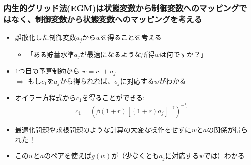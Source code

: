 \documentclass[unicode,9pt]{beamer}%
\begin{document}

\begin{frame}\frametitle{内生的グリッド法(EGM)は状態変数から制御変数へのマッピングではなく、制御変数から状態変数へのマッピングを考える}
  \begin{itemize}
    \item 離散化した制御変数$a_j$から$w$を得ることを考える
      \begin{itemize}
        \item 「ある貯蓄水準$a_j$が最適になるような所得$w$は何ですか？」
      \end{itemize}
      \bigskip
    \item 1つ目の予算制約から $w = c_1 + a_j$ \\
      $\Rightarrow$ もし$c_1$を$a_j$から得られれば、$a_j$に対応する$w$がわかる
    \item オイラー方程式から$c_1$を得ることができる:
      $$
        c_1 = \left(\beta (1 + r) \left[ (1 + r) a_j \right]^{-\gamma} \right)^{- \frac{1}{\gamma}}
      $$
    \item 最適化問題や求根問題のような計算の大変な操作をせずに$w$と$a$の関係が得られた！
    \item この$w$と$a$のペアを使えば$g(w)$が（少なくとも$a_j$に対応する$w$では）わかる
  \end{itemize}
\end{frame}
\end{document}
